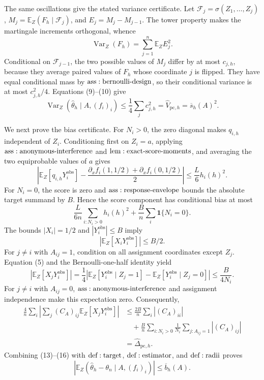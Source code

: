 The same oscillations give the stated variance certificate.  Let \(\mathcal F_j=\sigma(Z_1,\ldots,Z_j)\), \(M_j=\mathbb E_Z(F_h\mid\mathcal F_j)\), and \(E_j=M_j-M_{j-1}\).  The tower property makes the martingale increments orthogonal, whence
\[
 \operatorname{Var}_Z(F_h)=\sum_{j=1}^n\mathbb E_ZE_j^2.
\tag{10}
\]
Conditional on \(\mathcal F_{j-1}\), the two possible values of \(M_j\) differ by at most \(c_{j,h}\), because they average paired values of \(F_h\) whose coordinate \(j\) is flipped.  They have equal conditional mass by \({\rm ass:bernoulli\text{-}design}\), so their conditional variance is at most \(c_{j,h}^2/4\).  Equations (9)--(10) give
\[
 \operatorname{Var}_Z(\widehat\theta_h\mid A,(f_i)_i)
 \leq\frac14\sum_jc_{j,h}^2
 =\widehat V_{\mathrm{pc},h}=\overline s_h(A)^2.
\tag{11}
\]

We next prove the bias certificate.  For \(N_i>0\), the zero diagonal makes \(q_{i,h}\) independent of \(Z_i\).  Conditioning first on \(Z_i=a\), applying \({\rm ass:anonymous\text{-}interference}\) and \({\rm lem:exact\text{-}score\text{-}moments}\), and averaging the two equiprobable values of \(a\) gives
\[
 \left|\mathbb E_Z[q_{i,h}Y_i^{\mathrm{obs}}]
 -\frac{\partial_xf_i(1,1/2)+\partial_xf_i(0,1/2)}2\right|
 \leq\frac L6h_i(h)^2.
\tag{12}
\]
For \(N_i=0\), the score is zero and \({\rm ass:response\text{-}envelope}\) bounds the absolute target summand by \(B\).  Hence the score component has conditional bias at most
\[
 \frac{L}{6n}\sum_{i:N_i>0}h_i(h)^2
 +\frac Bn\sum_i\mathbf1\{N_i=0\}.
\tag{13}
\]
The bounds \(|X_i|=1/2\) and \(|Y_i^{\mathrm{obs}}|\leq B\) imply
\[
 |\mathbb E_Z[X_iY_i^{\mathrm{obs}}]|\leq B/2.
\tag{14}
\]
For \(j\ne i\) with \(A_{ij}=1\), condition on all assignment coordinates except \(Z_j\).  Equation (5) and the Bernoulli-one-half identity yield
\[
 |\mathbb E_Z[X_jY_i^{\mathrm{obs}}]|
 =\frac14\left|\mathbb E_Z[Y_i^{\mathrm{obs}}\mid Z_j=1]
 -\mathbb E_Z[Y_i^{\mathrm{obs}}\mid Z_j=0]\right|
 \leq\frac B{4N_i}.
\tag{15}
\]
For \(j\ne i\) with \(A_{ij}=0\), \({\rm ass:anonymous\text{-}interference}\) and assignment independence make this expectation zero.  Consequently,
\[
\begin{aligned}
 \frac4n\sum_i\left|\sum_j(C_A)_{ij}\mathbb E_Z[X_jY_i^{\mathrm{obs}}]\right|
 &\leq\frac{2B}{n}\sum_i|(C_A)_{ii}|\\
 &\quad+\frac Bn\sum_{i:N_i>0}\frac1{N_i}
       \sum_{j:A_{ij}=1}|(C_A)_{ij}|\\
 &=\widehat\Delta_{\mathrm{pc},h}.
\end{aligned}
\tag{16}
\]
Combining (13)--(16) with \({\rm def:target}\), \({\rm def:estimator}\), and \({\rm def:radii}\) proves
\[
 \left|\mathbb E_Z(\widehat\theta_h-\theta_n\mid A,(f_i)_i)\right|
 \leq\overline b_h(A).
\tag{17}
\]


